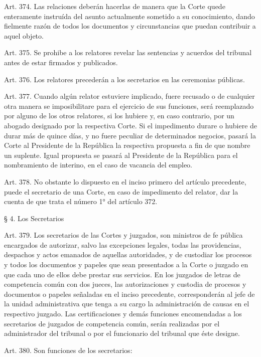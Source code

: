     Art. 374. Las relaciones deberán hacerlas de manera que la Corte quede enteramente instruída del asunto actualmente sometido a su conocimiento, dando fielmente razón de todos los documentos y circunstancias que puedan contribuir a aquel objeto.


    Art. 375. Se prohibe a los relatores revelar las sentencias y acuerdos del tribunal antes de estar firmados y publicados.

    Art. 376. Los relatores precederán a los secretarios en las ceremonias públicas.


    Art. 377. Cuando algún relator estuviere implicado, fuere recusado o de cualquier otra manera se imposibilitare para el ejercicio de sus funciones, será reemplazado por alguno de los otros relatores, si los hubiere y, en caso contrario, por un abogado designado por la respectiva Corte.
    Si el impedimento durare o hubiere de durar más de quince días, y no fuere peculiar de determinados negocios, pasará la Corte al Presidente de la República la respectiva propuesta a fin de que nombre un suplente.
    Igual propuesta se pasará al Presidente de la República para el nombramiento de interino, en el caso de vacancia del empleo.

    Art. 378. No obstante lo dispuesto en el inciso primero del artículo precedente, puede el secretario de una Corte, en caso de impedimento del relator, dar la cuenta de que trata el número 1° del artículo 372.

    § 4. Los Secretarios


    Art. 379. Los secretarios de las Cortes y juzgados, son ministros de fe pública encargados de autorizar, salvo las excepciones legales, todas las providencias, despachos y actos emanados de aquellas autoridades, y de custodiar los procesos y todos los documentos y papeles que sean presentados a la Corte o juzgado en que cada uno de ellos debe prestar sus servicios.
    En los juzgados de letras de competencia común con dos jueces, las autorizaciones y custodia de procesos y documentos o papeles señaladas en el inciso precedente, corresponderán al jefe de la unidad administrativa que tenga a su cargo la administración de causas en el respectivo juzgado.
    Las certificaciones y demás funciones encomendadas a los secretarios de juzgados de competencia común, serán realizadas por el administrador del tribunal o por el funcionario del tribunal que éste designe.



    Art. 380. Son funciones de los secretarios:


